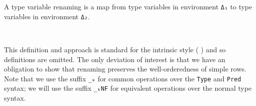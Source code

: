 \documentclass[authoryear, acmsmall, screen, review, nonacm]{acmart}
\begin{document}
A type variable renaming is a map from type variables in environment \verb!Δ₁! to type variables in environment \verb!Δ₂!. 
\begin{code}%
\>[0]\AgdaSpace{}%
\AgdaSymbol{:}\AgdaSpace{}%
\AgdaSpace{}%
\AgdaSpace{}%
\AgdaSpace{}%
\AgdaSpace{}%
\<%
\\
\>[0]\AgdaSpace{}%
\AgdaSpace{}%
\AgdaSpace{}%
\AgdaSymbol{=}\AgdaSpace{}%
\AgdaSpace{}%
\AgdaSymbol{\{}\AgdaSymbol{\}}\AgdaSpace{}%
\AgdaSpace{}%
\AgdaSpace{}%
\AgdaSpace{}%
\AgdaSpace{}%
\AgdaSpace{}%
\AgdaSpace{}%
\AgdaSpace{}%
\<%
\end{code}

\Ni This definition and approach is standard for the intrinsic style (\cf{} \citet{plfa22, ChapmanKNW19}) and so definitions are omitted. The only deviation of interest is that we have an obligation to show that renaming preserves the well-orderedness of simple rows. Note that we use the suffix \verb!_ₖ! for common operations over the \verb!Type! and \verb!Pred! syntax; we will use the suffix \verb!_ₖNF! for equivalent operations over the normal type syntax.
\end{document}
